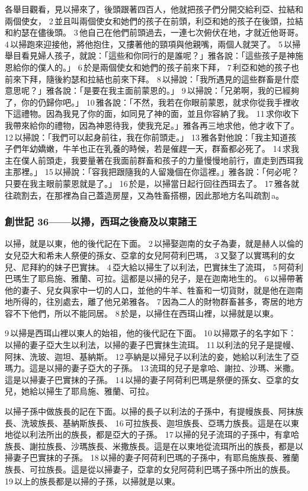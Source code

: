 各舉目觀看，見以掃來了，後頭跟著四百人，他就把孩子們分開交給利亞、拉結和兩個使女， 2 並且叫兩個使女和她們的孩子在前頭，利亞和她的孩子在後頭，拉結和約瑟在儘後頭。 3 他自己在他們前頭過去，一連七次俯伏在地，才就近他哥哥。 4 以掃跑來迎接他，將他抱住，又摟著他的頸項與他親嘴，兩個人就哭了。 5 以掃舉目看見婦人孩子，就說：「這些和你同行的是誰呢？」雅各說：「這些孩子是神施恩給你的僕人的。」 6 於是兩個使女和她們的孩子前來下拜， 7 利亞和她的孩子也前來下拜，隨後約瑟和拉結也前來下拜。 8 以掃說：「我所遇見的這些群畜是什麼意思呢？」雅各說：「是要在我主面前蒙恩的。」 9 以掃說：「兄弟啊，我的已經夠了，你的仍歸你吧。」 10 雅各說：「不然，我若在你眼前蒙恩，就求你從我手裡收下這禮物。因為我見了你的面，如同見了神的面，並且你容納了我。 11 求你收下我帶來給你的禮物，因為神恩待我，使我充足。」雅各再三地求他，他才收下了。 12 以掃說：「我們可以起身前往，我在你前頭走。」 13 雅各對他說：「我主知道孩子們年幼嬌嫩，牛羊也正在乳養的時候，若是催趕一天，群畜都必死了。 14 求我主在僕人前頭走，我要量著在我面前群畜和孩子的力量慢慢地前行，直走到西珥我主那裡。」 15 以掃說：「容我把跟隨我的人留幾個在你這裡。」雅各說：「何必呢？只要在我主眼前蒙恩就是了。」 16 於是，以掃當日起行回往西珥去了。 17 雅各就往疏割去，在那裡為自己蓋造房屋，又為牲畜搭棚，因此那地方名叫疏割 a。

\subsubsection{創世記 36——以掃，西珥之後裔及以東諸王}
以掃，就是以東，他的後代記在下面。 2 以掃娶迦南的女子為妻，就是赫人以倫的女兒亞大和希未人祭便的孫女、亞拿的女兒阿荷利巴瑪， 3 又娶了以實瑪利的女兒、尼拜約的妹子巴實抹。 4 亞大給以掃生了以利法，巴實抹生了流珥， 5 阿荷利巴瑪生了耶烏施、雅蘭、可拉。這都是以掃的兒子，是在迦南地生的。 6 以掃帶著他的妻子、兒女與家中一切的人口，並他的牛羊、牲畜和一切貨財，就是他在迦南地所得的，往別處去，離了他兄弟雅各。 7 因為二人的財物群畜甚多，寄居的地方容不下他們，所以不能同居。 8 於是，以掃住在西珥山裡，以掃就是以東。

9 以掃是西珥山裡以東人的始祖，他的後代記在下面。 10 以掃眾子的名字如下：以掃的妻子亞大生以利法，以掃的妻子巴實抹生流珥。 11 以利法的兒子是提幔、阿抹、洗玻、迦坦、基納斯。 12 亭納是以掃兒子以利法的妾，她給以利法生了亞瑪力。這是以掃的妻子亞大的子孫。 13 流珥的兒子是拿哈、謝拉、沙瑪、米撒。這是以掃妻子巴實抹的子孫。 14 以掃的妻子阿荷利巴瑪是祭便的孫女、亞拿的女兒，她給以掃生了耶烏施、雅蘭、可拉。

以掃子孫中做族長的記在下面。以掃的長子以利法的子孫中，有提幔族長、阿抹族長、洗玻族長、基納斯族長、 16 可拉族長、迦坦族長、亞瑪力族長。這是在以東地從以利法所出的族長，都是亞大的子孫。 17 以掃的兒子流珥的子孫中，有拿哈族長、謝拉族長、沙瑪族長、米撒族長。這是在以東地從流珥所出的族長，都是以掃妻子巴實抹的子孫。 18 以掃的妻子阿荷利巴瑪的子孫中，有耶烏施族長、雅蘭族長、可拉族長。這是從以掃妻子，亞拿的女兒阿荷利巴瑪子孫中所出的族長。 19 以上的族長都是以掃的子孫，以掃就是以東。


